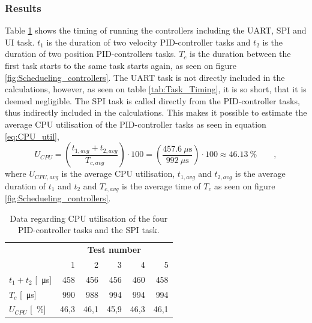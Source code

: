\documentclass[../../main.tex]{subfiles}
\begin{document}
\subsubsection*{Results}
Table \ref{tab:CPU_utilisation_test} shows the timing of running the controllers including the UART, SPI and UI task. 
$t_1$ is the duration of two velocity PID-controller tasks and $t_2$ is the duration of two position PID-controllers tasks. $T_c$ is the duration between the first task starts to the same task starts again, as seen on figure \ref{fig:Schedueling_controllers}. The UART task is not directly included in the calculations, however, as seen on table \ref{tab:Task_Timing}, it is so short, that it is deemed negligible. The SPI task is called directly from the PID-controller tasks, thus indirectly included in the calculations. This makes it possible to estimate the average CPU utilisation of the PID-controller tasks as seen in equation \ref{eq:CPU_util},
\begin{equation}\label{eq:CPU_util}
    U_{CPU} =\left(\frac{t_{1,avg} + t_{2,avg}}{T_{c,avg}}\right)\cdot 100=\left(\frac{\SI{457,6}{\mu\second}}{\SI{992}{\mu\second}}\right)\cdot 100\approx \SI{46,13}{\percent} \qquad , 
\end{equation}
where $ U_{CPU,avg} $ is the average CPU utilisation, $t_{1,avg}$ and $ t_{2,avg}$ is the average duration of $t_1$ and $t_2$ and $T_{c,avg}$ is the average time of $T_c$ as seen on figure \ref{fig:Schedueling_controllers}. 

\begin{table}[H]
\centering
\begin{tabular}{lrrrrr}
\multicolumn{1}{c}{\textbf{}}            & \multicolumn{5}{c}{\textbf{Test number}}                                                                                              \\
\multicolumn{1}{r|}{}                    & \multicolumn{1}{r|}{1}    & \multicolumn{1}{r|}{2}    & \multicolumn{1}{r|}{3}    & \multicolumn{1}{r|}{4}    & \multicolumn{1}{r}{5} \\ \hline
\multicolumn{1}{l|}{$t_1 + t_2$ [\SI{}{\micro\second}]} & \multicolumn{1}{r|}{458}  & \multicolumn{1}{r|}{456}  & \multicolumn{1}{r|}{456}  & \multicolumn{1}{r|}{460}  & 458                   \\
\multicolumn{1}{l|}{$T_c$ [\SI{}{\micro\second}]}                 & \multicolumn{1}{r|}{990}  & \multicolumn{1}{r|}{988}  & \multicolumn{1}{r|}{994}  & \multicolumn{1}{r|}{994}  & 994                   \\
\multicolumn{1}{l|}{$U_{CPU}$ [\SI{}{\percent}]}          & \multicolumn{1}{r|}{46,3} & \multicolumn{1}{r|}{46,1} & \multicolumn{1}{r|}{45,9} & \multicolumn{1}{r|}{46,3} & 46,1                 
\end{tabular}
\caption{Data regarding CPU utilisation of the four PID-controller tasks and the SPI task.}
\label{tab:CPU_utilisation_test}
\end{table}
\end{document}
